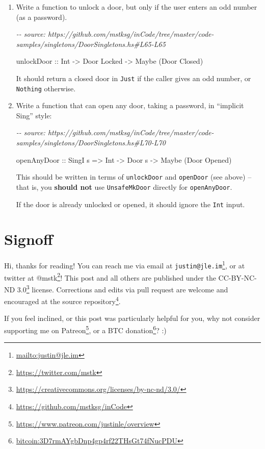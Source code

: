 \documentclass[]{article}
\newenvironment{Shaded}{}{}
\newcommand{\CommentTok}[1]{\textcolor[rgb]{0.38,0.63,0.69}{\textit{#1}}}
\newcommand{\DataTypeTok}[1]{\textcolor[rgb]{0.56,0.13,0.00}{#1}}
\newcommand{\NormalTok}[1]{#1}
\newcommand{\OtherTok}[1]{\textcolor[rgb]{0.00,0.44,0.13}{#1}}
\renewcommand{\href}[2]{#2\footnote{\url{#1}}}
\begin{document}
\begin{enumerate}
\def\labelenumi{\arabic{enumi}.}
\item
  Write a function to unlock a door, but only if the user enters an odd number
  (as a password).

\begin{Shaded}
\begin{Highlighting}[]
\CommentTok{{-}{-} source: https://github.com/mstksg/inCode/tree/master/code{-}samples/singletons/DoorSingletons.hs\#L65{-}L65}

\OtherTok{unlockDoor ::} \DataTypeTok{Int} \OtherTok{{-}\textgreater{}} \DataTypeTok{Door} \DataTypeTok{\textquotesingle{}Locked} \OtherTok{{-}\textgreater{}} \DataTypeTok{Maybe}\NormalTok{ (}\DataTypeTok{Door} \DataTypeTok{\textquotesingle{}Closed}\NormalTok{)}
\end{Highlighting}
\end{Shaded}

  It should return a closed door in \texttt{Just} if the caller gives an odd
  number, or \texttt{Nothing} otherwise.
\item
  Write a function that can open any door, taking a password, in ``implicit
  Sing'' style:

\begin{Shaded}
\begin{Highlighting}[]
\CommentTok{{-}{-} source: https://github.com/mstksg/inCode/tree/master/code{-}samples/singletons/DoorSingletons.hs\#L70{-}L70}

\OtherTok{openAnyDoor ::} \DataTypeTok{SingI}\NormalTok{ s }\OtherTok{=\textgreater{}} \DataTypeTok{Int} \OtherTok{{-}\textgreater{}} \DataTypeTok{Door}\NormalTok{ s }\OtherTok{{-}\textgreater{}} \DataTypeTok{Maybe}\NormalTok{ (}\DataTypeTok{Door} \DataTypeTok{\textquotesingle{}Opened}\NormalTok{)}
\end{Highlighting}
\end{Shaded}

  This should be written in terms of \texttt{unlockDoor} and \texttt{openDoor}
  (see above) -- that is, you \textbf{should not} use \texttt{UnsafeMkDoor}
  directly for \texttt{openAnyDoor}.

  If the door is already unlocked or opened, it should ignore the \texttt{Int}
  input.
\end{enumerate}

\section{Signoff}\label{signoff}

Hi, thanks for reading! You can reach me via email at
\href{mailto:justin@jle.im}{\nolinkurl{justin@jle.im}}, or at twitter at
\href{https://twitter.com/mstk}{@mstk}! This post and all others are published
under the \href{https://creativecommons.org/licenses/by-nc-nd/3.0/}{CC-BY-NC-ND
3.0} license. Corrections and edits via pull request are welcome and encouraged
at \href{https://github.com/mstksg/inCode}{the source repository}.

If you feel inclined, or this post was particularly helpful for you, why not
consider \href{https://www.patreon.com/justinle/overview}{supporting me on
Patreon}, or a \href{bitcoin:3D7rmAYgbDnp4gp4rf22THsGt74fNucPDU}{BTC donation}?
:)
\end{document}

